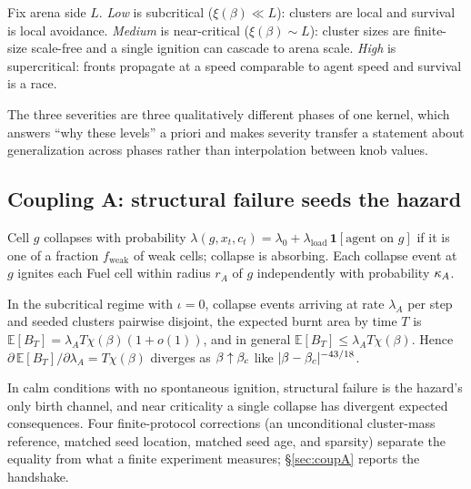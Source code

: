 \begin{definition}
\label{def:severity}
Fix arena side $L$. \emph{Low} is subcritical ($\xi(\beta) \ll L$): clusters
are local and survival is local avoidance. \emph{Medium} is near-critical
($\xi(\beta) \sim L$): cluster sizes are finite-size scale-free and a single
ignition can cascade to arena scale. \emph{High} is supercritical: fronts
propagate at a speed comparable to agent speed and survival is a race.
\end{definition}

The three severities are three qualitatively different phases of one kernel,
which answers ``why these levels'' a priori and makes severity transfer a
statement about generalization across phases rather than interpolation
between knob values.

\subsection{Coupling A: structural failure seeds the hazard}

\begin{definition}[Coupling A]
\label{def:coupA}
Cell $g$ collapses with probability $\lambda(g, x_t, c_t) = \lambda_0 +
\lambda_{\mathrm{load}}\,\mathbf{1}[\text{agent on } g]$ if it is one of a
fraction $f_{\mathrm{weak}}$ of weak cells; collapse is absorbing. Each
collapse event at $g$ ignites each Fuel cell within radius $r_A$ of $g$
independently with probability $\kappa_A$.
\end{definition}

\begin{proposition}
\label{prop:coupA}
In the subcritical regime with $\iota = 0$, collapse events arriving at rate
$\lambda_A$ per step and seeded clusters pairwise disjoint, the expected
burnt area by time $T$ is $\mathbb{E}[B_T] = \lambda_A T \chi(\beta)(1+o(1))$,
and in general $\mathbb{E}[B_T] \le \lambda_A T \chi(\beta)$. Hence
$\partial\,\mathbb{E}[B_T]/\partial \lambda_A = T\chi(\beta)$ diverges as
$\beta \uparrow \beta_c$ like $|\beta - \beta_c|^{-43/18}$.
\end{proposition}

In calm conditions with no spontaneous ignition, structural failure is the
hazard's only birth channel, and near criticality a single collapse has
divergent expected consequences. Four finite-protocol corrections (an
unconditional cluster-mass reference, matched seed location, matched seed age,
and sparsity) separate the equality from what a finite experiment measures;
\S\ref{sec:coupA} reports the handshake.

